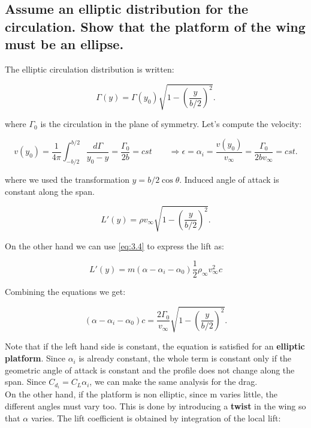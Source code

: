 \documentclass[british,french,11pt, a4paper, openany]{article}
\begin{document}
\subsection{Assume an elliptic distribution for the circulation. Show that the platform of the wing must be an ellipse.}

The elliptic circulation distribution is written:

\begin{equation}
\Gamma (y) = \Gamma (y_0) \sqrt{1-\left( \frac{y}{b/2} \right)^2}.
\end{equation}

where $\Gamma _0$ is the circulation in the plane of symmetry. Let's compute the velocity:

\begin{equation}
v(y_0) = \frac{1}{4\pi} \int _{-b/2}^{b/2} \frac{d\Gamma }{y_0 - y} = \frac{\Gamma _0}{2b} = cst \qquad \Rightarrow \epsilon = \alpha _i = \frac{v(y_0)}{v_\infty} = \frac{\Gamma _0}{2b v_\infty} = cst.
\end{equation}

where we used the transformation $y = b/2 \cos \theta$. Induced angle of attack is constant along the span.

\begin{equation}
L'(y) = \rho v_\infty \sqrt{1-\left( \frac{y}{b/2} \right)^2}.
\end{equation}

On the other hand we can use \eqref{eq:3.4} to express the lift as: 

\begin{equation}
L'(y) = m (\alpha - \alpha _i - \alpha _0) \frac{1}{2} \rho _\infty v_\infty ^2 c
\end{equation}

Combining the equations we get: 

\begin{equation}
(\alpha - \alpha _i - \alpha _0) c = \frac{2\Gamma _0}{v_\infty} \sqrt{1-\left( \frac{y}{b/2}\right)^2}. 
\end{equation}

Note that if the left hand side is constant, the equation is satisfied for an \textbf{elliptic platform}. Since $\alpha _i$ is already constant, the whole term is constant only if the geometric angle of attack is constant and the profile does not change along the span. Since $C_{d_i} = C_L \alpha _i$, we can make the same analysis for the drag. \\

On the other hand, if the platform is non elliptic, since m varies little, the different angles must vary too. This is done by introducing a \textbf{twist} in the wing so that $\alpha$ varies. The lift coefficient is obtained by integration of the local lift:
\end{document}

